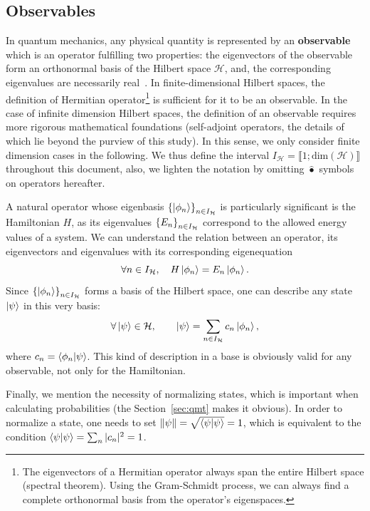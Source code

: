 \subsection{Observables}\label{sec:obs}
In quantum mechanics, any physical quantity is represented by an \textbf{observable} which is an operator fulfilling two properties: the eigenvectors of the observable form an orthonormal basis of the Hilbert space $\mathcal{H}$, and, the corresponding eigenvalues are necessarily real~\cite{CT}. In finite-dimensional Hilbert spaces, the definition of Hermitian operator\footnote{The eigenvectors of a Hermitian operator always span the entire Hilbert space (spectral theorem). Using the Gram-Schmidt process, we can always find a complete orthonormal basis from the operator's eigenspaces.} is sufficient for it to be an observable. In the case of infinite dimension Hilbert spaces, the definition of an observable requires more rigorous mathematical foundations (self-adjoint operators, the details of which lie beyond the purview of this study). In this sense, we only consider finite dimension cases in the following. We thus define the interval $I_\mathcal{H}=\llbracket 1;\text{dim}(\mathcal{H})\rrbracket$ throughout this document, also, we lighten the notation by omitting $\hat{\bullet}$ symbols on operators hereafter.

 A natural operator whose eigenbasis $\qty{\ket{\phi_n}}_{n\in{I_\mathcal{H}}}$ is particularly significant is the Hamiltonian $H$, as its eigenvalues $\qty{E_n}_{n\in{I_\mathcal{H}}}$ correspond to the allowed energy values of a system. We can understand the relation between an operator, its eigenvectors and eigenvalues with its corresponding eigenequation
\begin{equation}\label{eq:PropreH}
    \forall n \in I_\mathcal{H},\quad H\ket{\phi_n} = E_n\ket{\phi_n} .
\end{equation}
Since $\qty{\ket{\phi_n}}_{n\in{I_\mathcal{H}}}$ forms a basis of the Hilbert space, one can describe any state $\ket{\psi}$ in this very basis:
\begin{equation}\label{eq:stateinHbasis}
    \forall\ket{\psi}\in\mathcal{H},\qquad \ket{\psi} = \sum_{n\in I_\mathcal{H}} c_n\ket{\phi_n},
\end{equation}
where $c_n=\braket{\phi_n}{\psi}$. This kind of description in a base is obviously valid for any observable, not only for the Hamiltonian. 

Finally, we mention the necessity of normalizing states, which is important when calculating probabilities (the Section~\ref{sec:qmt} makes it obvious). In order to normalize a state, one needs to set $\norm{\psi}=\sqrt{\braket{\psi}{\psi}}=1$, which is equivalent to the condition $\braket{\psi}{\psi}=\sum_n |c_n|^2=1$.

